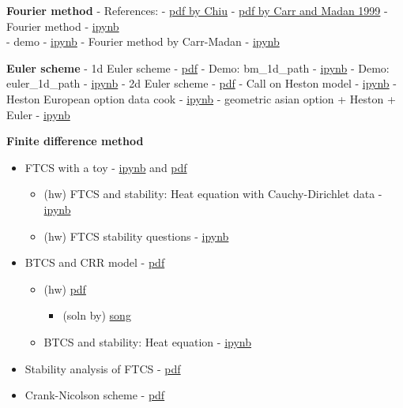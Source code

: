 \documentclass[11pt]{article}
\providecommand{\tightlist}{%
      \setlength{\itemsep}{0pt}\setlength{\parskip}{0pt}}
\begin{document}
    \textbf{Fourier method} - References: -
\href{other/paper/ChiXX_Fourier.pdf}{pdf by Chiu} -
\href{other/paper/CM99_FFT.pdf}{pdf by Carr and Madan 1999} - Fourier
method - \href{src/fourier_method.ipynb}{ipynb}\\
- demo - \href{src/fourier.ipynb}{ipynb} - Fourier method by Carr-Madan
- \href{src/fourier_carr_madan.ipynb}{ipynb}

    \textbf{Euler scheme} - 1d Euler scheme -
\href{./doc/euler_sde_1d.pdf}{pdf} - Demo: bm\_1d\_path -
\href{./src/bm_1d_path.ipynb}{ipynb} - Demo: euler\_1d\_path -
\href{./src/euler_1d.ipynb}{ipynb} - 2d Euler scheme -
\href{./doc/euler_sde_2d.pdf}{pdf} - Call on Heston model -
\href{./src/euler_heston.ipynb}{ipynb} - Heston European option data
cook - \href{./src/heston_data_cook.ipynb}{ipynb} - geometric asian
option + Heston + Euler -
\href{src/heston_geometric_asian_euler.ipynb}{ipynb}

    \textbf{Finite difference method}

\begin{itemize}
\tightlist
\item
  FTCS with a toy - \href{src/ftcs_stability_heat_toy.ipynb}{ipynb} and
  \href{./doc/stability_ftcs_01.pdf}{pdf}

  \begin{itemize}
  \tightlist
  \item
    (hw) FTCS and stability: Heat equation with Cauchy-Dirichlet data -
    \href{./src/ftcs_stability_heat_1d.ipynb}{ipynb}
  \item
    (hw) FTCS stability questions -
    \href{src/hw_ftcs_stability.ipynb}{ipynb}
  \end{itemize}
\item
  BTCS and CRR model - \href{doc/fdm_crr.pdf}{pdf}

  \begin{itemize}
  \tightlist
  \item
    (hw) \href{doc/hw_crr.pdf}{pdf}

    \begin{itemize}
    \tightlist
    \item
      (soln by) \href{src/L05s01.ipynb}{song}
    \end{itemize}
  \item
    BTCS and stability: Heat equation -
    \href{./src/btcs_stability_heat_1d.ipynb}{ipynb}
  \end{itemize}
\item
  Stability analysis of FTCS - \href{./doc/stability_ftcs_02.pdf}{pdf}
\item
  Crank-Nicolson scheme - \href{./doc/stability_ftcs_03.pdf}{pdf}
\end{itemize}
\end{document}
